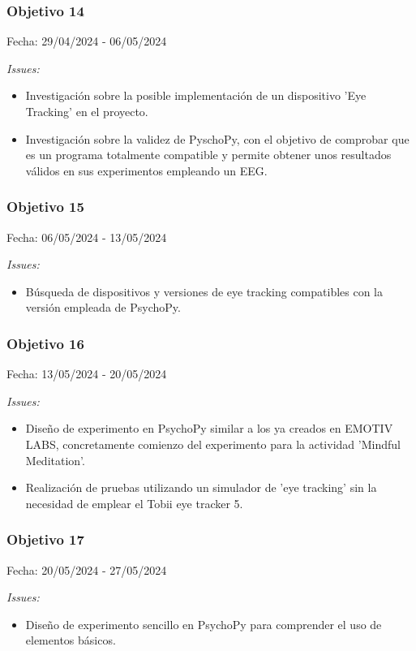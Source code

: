 \subsubsection{Objetivo 14}
Fecha: 29/04/2024 - 06/05/2024

\textit{Issues:}
\begin{itemize}
    \item Investigación sobre la posible implementación de un dispositivo 'Eye Tracking' en el proyecto.
    \item Investigación sobre la validez de PyschoPy, con el objetivo de comprobar que es un programa totalmente compatible y permite obtener unos resultados válidos en sus experimentos empleando un EEG.
\end{itemize}

\subsubsection{Objetivo 15}
Fecha: 06/05/2024 - 13/05/2024

\textit{Issues:}
\begin{itemize}
    \item Búsqueda de dispositivos y versiones de eye tracking compatibles con la versión empleada de PsychoPy.
\end{itemize}

\subsubsection{Objetivo 16}
Fecha: 13/05/2024 - 20/05/2024

\textit{Issues:}
\begin{itemize}
    \item Diseño de experimento en PsychoPy similar a los ya creados en EMOTIV LABS, concretamente comienzo del experimento para la actividad 'Mindful Meditation'.
    \item Realización de pruebas utilizando un simulador de 'eye tracking' sin la necesidad de emplear el Tobii eye tracker 5.
\end{itemize}

\subsubsection{Objetivo 17}
Fecha: 20/05/2024 - 27/05/2024

\textit{Issues:}
\begin{itemize}
    \item Diseño de experimento sencillo en PsychoPy para comprender el uso de elementos básicos.
\end{itemize}

